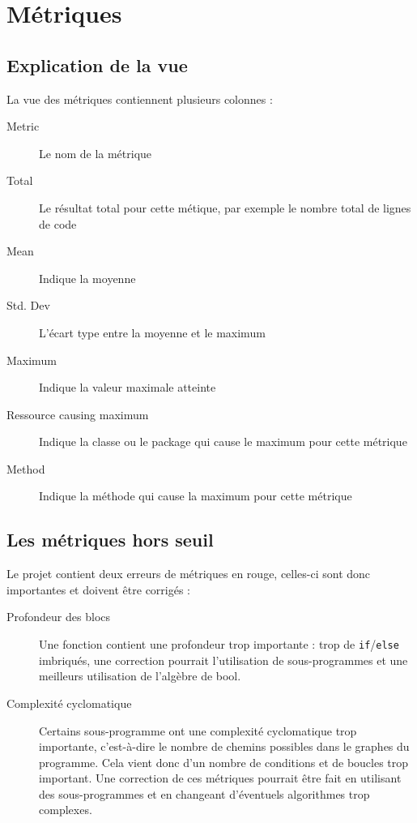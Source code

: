 \documentclass[12pt,a4paper,openany]{book}
\begin{document}
	\thispagestyle{empty} %
	\titleBC 
	\tableofcontents
	\dominitoc
	\setcounter{tocdepth}{1}
	\setcounter{secnumdepth}{1}
	\setcounter{minitocdepth}{1}
	\chapter{Métriques}\label{metrics}
	\section{Explication de la vue}
	La vue des métriques contiennent plusieurs colonnes : 
	\begin{description}
		\item[Metric] Le nom de la métrique
		\item[Total] Le résultat total pour cette métique, par exemple le nombre total de lignes de code
		\item[Mean] Indique la moyenne
		\item[Std. Dev] L'écart type entre la moyenne et le maximum
		\item[Maximum] Indique la valeur maximale atteinte
		\item[Ressource causing maximum] Indique la classe ou le package qui cause le maximum pour cette métrique
		\item[Method] Indique la méthode qui cause la maximum pour cette métrique
	\end{description}

	\section{Les métriques hors seuil}
	Le projet contient deux erreurs de métriques en rouge, celles-ci sont donc importantes et doivent être corrigés : 
	\begin{description}
		\item[Profondeur des blocs] Une fonction contient une profondeur trop importante : trop de \texttt{if}/\texttt{else} imbriqués, une correction
			pourrait l'utilisation de sous-programmes et une meilleurs utilisation de l'algèbre de bool.
		\item[Complexité cyclomatique] Certains sous-programme ont une complexité cyclomatique trop importante, c'est-à-dire le nombre de chemins
			possibles dans le graphes du programme. Cela vient donc d'un nombre de conditions et de boucles trop important. 
			Une correction de ces métriques pourrait être fait en utilisant des sous-programmes et en changeant d'éventuels algorithmes trop complexes.
	\end{description}
\end{document}
